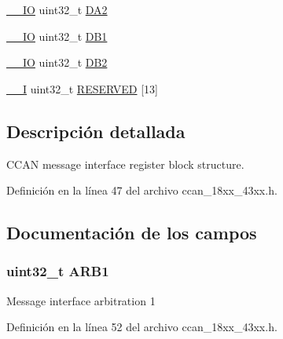 \begin{DoxyCompactItemize}
\item 
\hyperlink{core__sc300_8h_aec43007d9998a0a0e01faede4133d6be}{\+\_\+\+\_\+\+IO} uint32\+\_\+t \hyperlink{struct_c_c_a_n___i_f___t_aa172382232cd70b775b43668705bbd30}{D\+A2}
\item 
\hyperlink{core__sc300_8h_aec43007d9998a0a0e01faede4133d6be}{\+\_\+\+\_\+\+IO} uint32\+\_\+t \hyperlink{struct_c_c_a_n___i_f___t_a0391f1b2bda043bfe608120be60db4c8}{D\+B1}
\item 
\hyperlink{core__sc300_8h_aec43007d9998a0a0e01faede4133d6be}{\+\_\+\+\_\+\+IO} uint32\+\_\+t \hyperlink{struct_c_c_a_n___i_f___t_a1579d8f76b3f0add6ac7f9af6bb672da}{D\+B2}
\item 
\hyperlink{core__sc300_8h_af63697ed9952cc71e1225efe205f6cd3}{\+\_\+\+\_\+I} uint32\+\_\+t \hyperlink{struct_c_c_a_n___i_f___t_aab95e449201210100f518b9d5d6fe52f}{R\+E\+S\+E\+R\+V\+ED} \mbox{[}13\mbox{]}
\end{DoxyCompactItemize}


\subsection{Descripción detallada}
C\+C\+AN message interface register block structure. 

Definición en la línea 47 del archivo ccan\+\_\+18xx\+\_\+43xx.\+h.



\subsection{Documentación de los campos}
\subsubsection[{\texorpdfstring{A\+R\+B1}{ARB1}}]{ uint32\+\_\+t A\+R\+B1}\hypertarget{struct_c_c_a_n___i_f___t_a422ddf34026d15ba1fc9d263af854abc}{}\label{struct_c_c_a_n___i_f___t_a422ddf34026d15ba1fc9d263af854abc}
Message interface arbitration 1 

Definición en la línea 52 del archivo ccan\+\_\+18xx\+\_\+43xx.\+h.

